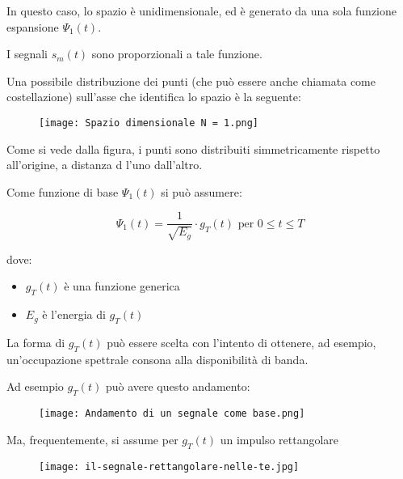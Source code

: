 In questo caso, lo spazio è unidimensionale, ed è generato da una sola funzione espansione $\Psi_1 (t)$. \newline 

I segnali $s_m (t)$ sono proporzionali a tale funzione. \newline 

Una possibile distribuzione dei punti (che può essere anche chiamata come costellazione) 
sull'asse che identifica lo spazio è la seguente: 

\begin{figure}[h]
    \centering
    \texttt{[image: Spazio dimensionale N = 1.png]}
\end{figure}

Come si vede dalla figura, i punti sono distribuiti simmetricamente rispetto all'origine, 
a distanza d l'uno dall'altro. \newline 

Come funzione di base $\Psi_1 (t)$ si può assumere: 

{
    \Large 
    \begin{equation}
        \Psi_1 (t) = \frac{1}{\sqrt{E_g}} \cdot g_{T} (t) \text{ per } 0 \le t \le T
    \end{equation}
}

dove: 

\begin{itemize}
    \item $g_T (t)$ è una funzione generica 
    \item $E_g$ è l'energia di $g_T (t)$
\end{itemize}

La forma di $g_T (t)$ può essere scelta con l'intento di ottenere, ad esempio, un'occupazione spettrale consona alla disponibilità di banda. \newline 

Ad esempio $g_T (t)$ può avere questo andamento: 

\begin{figure}[h]
    \centering
    \texttt{[image: Andamento di un segnale come base.png]}
\end{figure}

\newpage 

Ma, frequentemente, si assume per $g_T (t)$ un impulso rettangolare

\begin{figure}[h]
    \centering
    \texttt{[image: il-segnale-rettangolare-nelle-te.jpg]}
\end{figure} 

